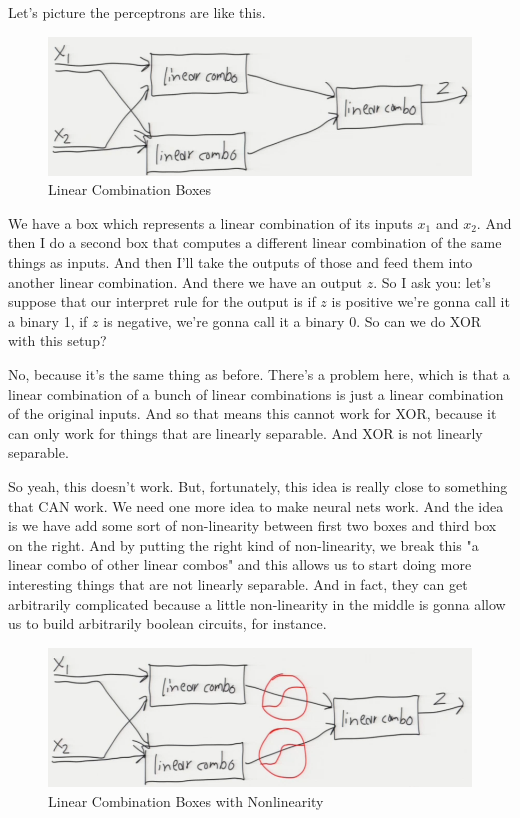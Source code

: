 \documentclass[fleqn,10pt]{olplainarticle}
\theoremstyle{definition}
\theoremstyle{remark}
\begin{document}
Let's picture the perceptrons are like this. 
\begin{figure}[ht]
\centering
\includegraphics[width=0.75\linewidth]{images/linear_combo_boxes}
\caption{Linear Combination Boxes}
\label{fig:linear_combo_boxes}
\end{figure}

We have a box which represents a linear combination of its inputs $x_1$ and $x_2$. And then I do a second box that computes a different linear combination of the same things as inputs. And then I'll take the outputs of those and feed them into another linear combination. And there we have an output $z$. So I ask you: let's suppose that our interpret rule for the output is if $z$ is positive we're gonna call it a binary 1, if $z$ is negative, we're gonna call it a binary 0. So can we do XOR with this setup?

No, because it's the same thing as before. There's a problem here, which is that a linear combination of a bunch of linear combinations is just a linear combination of the original inputs. And so that means this cannot work for XOR, because it can only work for things that are linearly separable. And XOR is not linearly separable. 

So yeah, this doesn't work. But, fortunately, this idea is really close to something that CAN work. We need one more idea to make neural nets work. And the idea is we have add some sort of non-linearity between first two boxes and third box on the right. And by putting the right kind of non-linearity, we break this "a linear combo of other linear combos" and this allows us to start doing more interesting things that are not linearly separable. And in fact, they can get arbitrarily complicated because a little non-linearity in the middle is gonna allow us to build arbitrarily boolean circuits, for instance.
\begin{figure}[ht]
\centering
\includegraphics[width=0.75\linewidth]{images/linear_combo_boxes_nonlinear}
\caption{Linear Combination Boxes with Nonlinearity}
\label{fig:linear_combo_boxes_nonlinear}
\end{figure}
\end{document}
